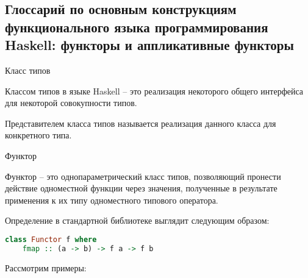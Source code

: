 \subsection{Глоссарий по основным конструкциям функционального языка программирования Haskell: функторы и аппликативные функторы}

\begin{defin} Класс типов

  Классом типов в языке Haskell -- это реализация некоторого общего интерфейса для некоторой совокупности типов.

  Представителем класса типов называется реализация данного класса для конкретного типа.
\end{defin}

\begin{defin} Функтор

  Функтор -- это однопараметрический класс типов, позволяющий пронести действие одноместной функции через значения,
  полученные в результате применения к их типу одноместного типового оператора.
\end{defin}

Определение в стандартной библиотеке выглядит следующим образом:

\begin{lstlisting}[language=Haskell]
  class Functor f where
    fmap :: (a -> b) -> f a -> f b
\end{lstlisting}

Рассмотрим примеры:

